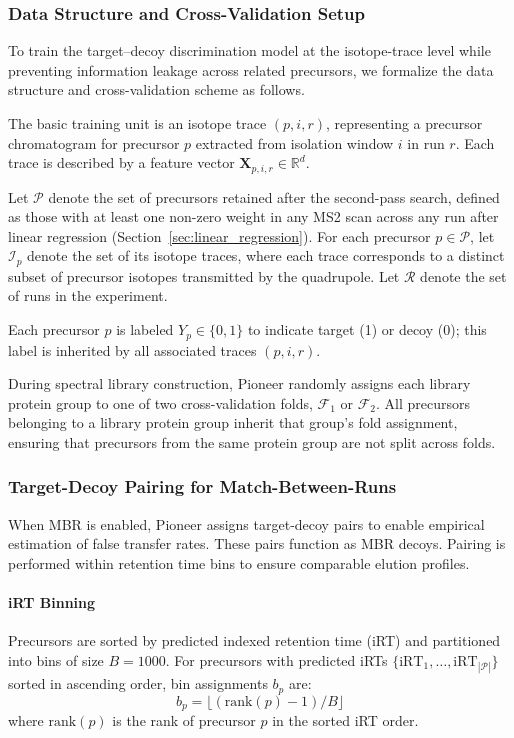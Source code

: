 \documentclass[pdflatex,sn-nature]{sn-jnl}
\begin{document}
\subsubsection{Data Structure and Cross-Validation Setup}\label{subsubsec:data-structure-cv-setup}

To train the target–decoy discrimination model at the isotope-trace level while preventing information leakage across related precursors, we formalize the data structure and cross-validation scheme as follows.

The basic training unit is an isotope trace $(p,i,r)$, representing a precursor chromatogram for precursor $p$ extracted from isolation window $i$ in run $r$. Each trace is described by a feature vector $\mathbf{X}_{p,i,r} \in \mathbb{R}^d$.

Let $\mathcal{P}$ denote the set of precursors retained after the second-pass search, defined as those with at least one non-zero weight in any MS2 scan across any run after linear regression (Section~\ref{sec:linear_regression}). For each precursor $p \in \mathcal{P}$, let $\mathcal{I}_p$ denote the set of its isotope traces, where each trace corresponds to a distinct subset of precursor isotopes transmitted by the quadrupole. Let $\mathcal{R}$ denote the set of runs in the experiment.

Each precursor $p$ is labeled $Y_p \in \{0,1\}$ to indicate target (1) or decoy (0); this label is inherited by all associated traces $(p,i,r)$.

During spectral library construction, Pioneer randomly assigns each library protein group to one of two cross-validation folds, $\mathcal{F}_1$ or $\mathcal{F}_2$. All precursors belonging to a library protein group inherit that group's fold assignment, ensuring that precursors from the same protein group are not split across folds.





\subsubsection{Target-Decoy Pairing for Match-Between-Runs}\label{subsubsec:target-decoy-pairing}

When MBR is enabled, Pioneer assigns target-decoy pairs to enable empirical estimation of false transfer rates. These pairs function as MBR decoys. Pairing is performed within retention time bins to ensure comparable elution profiles.

\paragraph{iRT Binning}\label{para:irt-binning} Precursors are sorted by predicted indexed retention time (iRT) and partitioned into bins of size $B = 1000$. For precursors with predicted iRTs $\{\text{iRT}_1, \ldots, \text{iRT}_{|\mathcal{P}|}\}$ sorted in ascending order, bin assignments $b_p$ are:
\begin{equation}
  b_p = \lfloor (\text{rank}(p) - 1) / B \rfloor
\end{equation}
where $\text{rank}(p)$ is the rank of precursor $p$ in the sorted iRT order.
\end{document}
